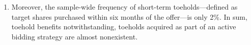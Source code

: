 \documentclass[12pt]{article}
\begin{document}
\begin{enumerate}
		\item Moreover, the sample-wide frequency of short-term toeholds—defined as target shares purchased within six months of the offer—is only 2\%. In sum, toehold benefits notwithstanding, toeholds acquired as part of an active bidding strategy are almost nonexistent. \citep{Mitchell2011}
	\end{enumerate}
\end{document}
